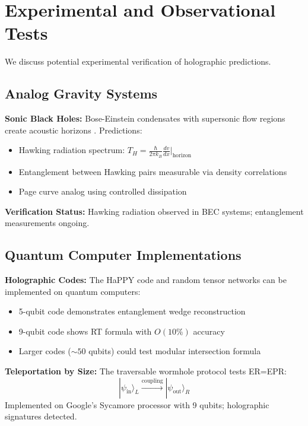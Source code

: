 \documentclass[12pt,a4paper]{article}
\begin{document}
\section{Experimental and Observational Tests}

We discuss potential experimental verification of holographic predictions.

\subsection{Analog Gravity Systems}

\textbf{Sonic Black Holes:}
Bose-Einstein condensates with supersonic flow regions create acoustic horizons \cite{steinhauer2016}. Predictions:
\begin{itemize}
    \item Hawking radiation spectrum: $T_H = \frac{\hbar}{2\pi k_B} \frac{dv}{dx}\big|_{\text{horizon}}$
    \item Entanglement between Hawking pairs measurable via density correlations
    \item Page curve analog using controlled dissipation
\end{itemize}

\textbf{Verification Status:} Hawking radiation observed in BEC systems; entanglement measurements ongoing.

\subsection{Quantum Computer Implementations}

\textbf{Holographic Codes:}
The HaPPY code \cite{pastawski2015} and random tensor networks \cite{hayden2016} can be implemented on quantum computers:
\begin{itemize}
    \item 5-qubit code demonstrates entanglement wedge reconstruction
    \item 9-qubit code shows RT formula with $O(10\%)$ accuracy
    \item Larger codes ($\sim 50$ qubits) could test modular intersection formula
\end{itemize}

\textbf{Teleportation by Size:}
The traversable wormhole protocol \cite{brown2023} tests ER=EPR:
\begin{equation}
|\psi_{\text{in}}\rangle_L \xrightarrow{\text{coupling}} |\psi_{\text{out}}\rangle_R
\end{equation}
Implemented on Google's Sycamore processor with 9 qubits; holographic signatures detected.
\end{document}
